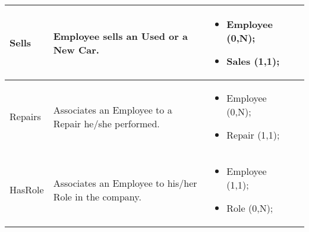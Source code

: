 \begin{longtable}{|p{}|p{} |p{}|p{} |}
Sells & Employee sells an Used or a New Car. & \begin{itemize}
	\vspace{-1em}
	\item Employee (0,N);
	\item Sales (1,1);
\end{itemize}
& \\\hline

Repairs & Associates an Employee to a Repair he/she performed. & \begin{itemize}
	\vspace{-1em}
	\item Employee (0,N);
	\item Repair (1,1);
\end{itemize}
& \\\hline

HasRole & Associates an Employee to his/her Role in the company. & \begin{itemize}
	\vspace{-1em}
	\item Employee (1,1);
	\item Role (0,N);
\end{itemize}
& \\\hline

\end{longtable}
